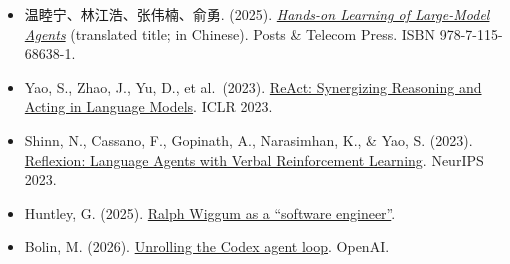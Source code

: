 \vspace{0.25em}
\begin{itemize}
\tightlist
\item
  温睦宁、林江浩、张伟楠、俞勇. (2025). \href{https://haa.boyuai.com/}{\emph{Hands-on Learning of Large-Model Agents}} (translated title; in Chinese). Posts \& Telecom Press. ISBN 978-7-115-68638-1.
\item
  Yao, S., Zhao, J., Yu, D., et al.~(2023). \href{https://arxiv.org/abs/2210.03629}{ReAct: Synergizing Reasoning and Acting in Language Models}. ICLR 2023.
\item
  Shinn, N., Cassano, F., Gopinath, A., Narasimhan, K., \& Yao, S. (2023). \href{https://arxiv.org/abs/2303.11366}{Reflexion: Language Agents with Verbal Reinforcement Learning}. NeurIPS 2023.
\item
  Huntley, G. (2025). \href{https://ghuntley.com/ralph/}{Ralph Wiggum as a ``software engineer''}.
\item
  Bolin, M. (2026). \href{https://openai.com/index/unrolling-the-codex-agent-loop/}{Unrolling the Codex agent loop}. OpenAI.
\end{itemize}

\clearpage
